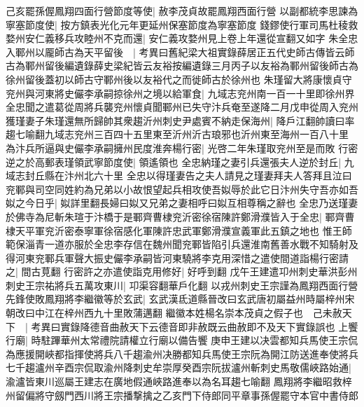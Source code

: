己亥罷孫偓鳳翔四面行營節度等使|{
	赦李茂貞故罷鳳翔西面行營}
以副都統李思諫為寧塞節度使|{
	按方鎮表光化元年更延州保塞節度為寧塞節度}
錢鏐使行軍司馬杜稜救婺州安仁義移兵攻睦州不克而還|{
	安仁義攻婺州見上卷上年還從宣翻又如字}
朱全忠入鄆州以龎師古為天平留後　|{
	考異曰舊紀梁大祖實錄薛居正五代史師古傳皆云師古為鄆州留後編遺錄薛史梁紀皆云友裕按編遺錄三月丙子以友裕為鄆州留後師古為徐州留後蓋初以師古守鄆州後以友裕代之而徙師古於徐州也}
朱瑾留大將康懷貞守兖州與河東將史儼李承嗣掠徐州之境以給軍食|{
	九域志兖州南一百一十里即徐州界}
全忠聞之遣葛從周將兵襲兖州懷貞聞鄆州已失守汴兵奄至遂降二月戊申從周入兖州獲瑾妻子朱瑾還無所歸帥其衆趨沂州刺史尹處賓不納走保海州|{
	降戶江翻帥讀曰率趨七喻翻九域志兖州三百四十五里東至沂州沂古琅邪也沂州東至海州一百八十里}
為汴兵所逼與史儼李承嗣擁州民度淮奔楊行密|{
	光啓二年朱瑾取兖州至是而敗}
行密逆之於高郵表瑾領武寧節度使|{
	領遙領也}
全忠納瑾之妻引兵還張夫人逆於封丘|{
	九域志封丘縣在汴州北六十里}
全忠以得瑾妻告之夫人請見之瑾妻拜夫人答拜且泣曰兖鄆與司空同姓約為兄弟以小故恨望起兵相攻使吾姒辱於此它日汴州失守吾亦如吾姒之今日乎|{
	姒詳里翻長婦曰姒又兄弟之妻相呼曰姒互相尊稱之辭也}
全忠乃送瑾妻於佛寺為尼斬朱瑄于汴橋于是鄆齊曹棣兖沂密徐宿陳許鄭滑濮皆入于全忠|{
	鄆齊曹棣天平軍兖沂密泰寧軍徐宿感化軍陳許忠武軍鄭滑濮宣義軍此五鎮之地也}
惟王師範保淄青一道亦服於全忠李存信在魏州聞兖鄆皆陷引兵還淮南舊善水戰不知騎射及得河東兖鄆兵軍聲大振史儼李承嗣皆河東驍將李克用深惜之遣使間道詣楊行密請之|{
	間古莧翻}
行密許之亦遣使詣克用修好|{
	好呼到翻}
戊午王建遣卭州刺史華洪彭州刺史王宗祐將兵五萬攻東川|{
	卭渠容翻華戶化翻}
以戎州刺史王宗謹為鳳翔西面行營先鋒使敗鳳翔將李繼徽等於玄武|{
	玄武漢氐道縣晉改曰玄武唐初屬益州時屬梓州宋朝改曰中江在梓州西九十里敗蒲邁翻}
繼徽本姓楊名崇本茂貞之假子也　己未赦天下　|{
	考異曰實錄降德音曲赦天下云德音即非赦既云曲赦即不及天下實錄誤也}
上饗行廟|{
	時駐蹕華州太常禮院請權立行廟以備告饗}
庚申王建以决雲都知兵馬使王宗侃為應援開峽都指揮使將兵八千趨渝州决勝都知兵馬使王宗阮為開江防送進奉使將兵七千趨瀘州辛酉宗侃取渝州降刺史牟崇厚癸酉宗阮拔瀘州斬刺史馬敬儒峽路始通|{
	渝瀘皆東川巡屬王建志在廣地假通峽路進奉以為名耳趨七喻翻}
鳳翔將李繼昭救梓州留偏將守劔門西川將王宗播撃擒之乙亥門下侍郎同平章事孫偓罷守本官中書侍郎

